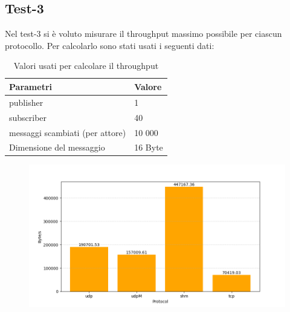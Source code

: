 \begin{figure}[H]
    \centering
\end{figure}


\subsection{Test-3}
Nel test-3 si è voluto misurare il throughput massimo possibile per ciascun protocollo. Per calcolarlo sono stati usati i seguenti dati:

\begin{table}[H]
    \begin{center}
    \begin{tabular}{l|l}
        \hline
        \textbf{Parametri} & \textbf{Valore}\\
        \hline
        [\#] publisher & 1 \\
        \hline
        [\#] subscriber & 40 \\
        \hline
        [\#] messaggi scambiati (per attore) & 10 000 \\
        \hline
        Dimensione del messaggio & 16 Byte \\
        \hline
    \end{tabular}
    \end{center}
    \caption{Valori usati per calcolare il throughput}\label{table:hpc-cineca}
    \end{table}
    

\begin{figure}[H]
    \includegraphics[width=\textwidth]{./results/test3_throughput.png} 
        \caption{} %
        \label{}
\end{figure}


